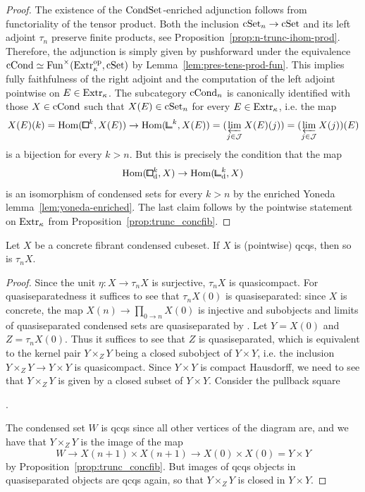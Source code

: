 \begin{proof}
The existence of the $\mathrm{CondSet}$-enriched adjunction follows from functoriality of the tensor product.
Both the inclusion $\mathrm{cSet}_n\to\mathrm{cSet}$ and its left adjoint $\tau_n$ preserve finite products, see Proposition~\ref{prop:n-trunc-ihom-prod}.
Therefore, the adjunction is simply given by pushforward under the equivalence $\mathrm{cCond}\simeq\operatorname{Fun}^\times(\mathrm{Extr}_\kappa^{\mathrm{op}},\mathrm{cSet})$
by Lemma~\ref{lem:pres-tens-prod-fun}.
This implies fully faithfulness of the right adjoint and the computation of the left adjoint pointwise on $E\in\mathrm{Extr}_\kappa$.
The subcategory $\mathrm{cCond}_n$ is canonically identified with those $X\in\mathrm{cCond}$ such that $X(E)\in\mathrm{cSet}_n$ for every $E\in\mathrm{Extr}_\kappa$,
i.e. the map
\[
    X(E)(k) = \hom({\bbox}^k,X(E))\to\hom({\bbcor}^k,X(E)) = (\varprojlim_{j\in\cJ} X(E)(j)) = (\varprojlim_{j\in\cJ} X(j))(E)
\]
is a bijection for every $k>n$.
But this is precisely the condition that the map
\[
    \hom({\bbox}^k_\ud,X)\to\hom({\bbcor}^k_\ud,X)
\]
is an isomorphism of condensed sets for every $k>n$ by the enriched Yoneda lemma~\ref{lem:yoneda-enriched}.
The last claim follows by the pointwise statement on $\mathrm{Extr}_\kappa$ from Proposition~\ref{prop:trunc_concfib}.
\end{proof}

\begin{proposition}\label{prop:cond-cube-trunc-qcqs}
Let $X$ be a concrete fibrant condensed cubeset.
If $X$ is (pointwise) qcqs, then so is $\tau_n X$.
\end{proposition}

\begin{proof}
Since the unit $\eta\colon X\to\tau_n X$ is surjective, $\tau_n X$ is quasicompact.
For quasiseparatedness it suffices to see that $\tau_n X(0)$ is quasiseparated:
since $X$ is concrete, the map $X(n)\to\prod_{0\to n}X(0)$ is injective
and subobjects and limits of quasiseparated condensed sets are quasiseparated by \cite[Lemma 2.5.47]{Bihlmaier2025}.
Let $Y = X(0)$ and $Z = \tau_nX(0)$.
Thus it suffices to see that $Z$ is quasiseparated,
which is equivalent to the kernel pair $Y\times_Z Y$ being a closed subobject of $Y\times Y$,
i.e. the inclusion $Y\times_Z Y\to Y\times Y$ is quasicompact.
Since $Y\times Y$ is compact Hausdorff, we need to see that $Y\times_Z Y$ is given by a closed subset of $Y\times Y$.
Consider the pullback square
\begin{center}
.
\end{center}
The condensed set $W$ is qcqs since all other vertices of the diagram are,
and we have that $Y\times_Z Y$ is the image of the map
\[
    W\to X(n+1)\times X(n+1)\to X(0)\times X(0) = Y\times Y
\]
by Proposition~\ref{prop:trunc_concfib}.
But images of qcqs objects in quasiseparated objects are qcqs again, so that $Y\times_Z Y$ is closed in $Y\times Y$.
\end{proof}

